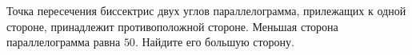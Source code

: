 \begin{ex}
	\begin{condition}
		Точка пересечения биссектрис двух углов параллелограмма, прилежащих к одной стороне, принадлежит противоположной стороне. Меньшая сторона параллелограмма равна \( 50 \). Найдите его большую сторону.
	\end{condition}
\end{ex}